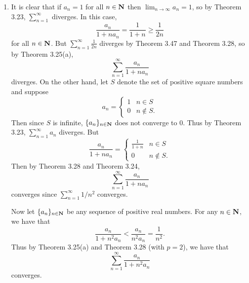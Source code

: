 \begin{ex}
\begin{enumerate}
\item It is clear that if $a_n = 1$ for all $n \in \mathbf{N}$ then $\lim_{n\to\infty}a_n = 1$, so by Theorem 3.23, $\sum_{n = 1}^{\infty}$ diverges. In this case, \[\frac{a_n}{1 + na_n} = \frac{1}{1 + n} \geq \frac{1}{2n}\] for all $n \in \mathbf{N}$. But $\sum_{n = 1}^{\infty}\frac{1}{2n}$ diverges by Theorem 3.47 and Theorem 3.28, so by Theorem 3.25(a), \[\sum_{n = 1}^{\infty}\frac{a_n}{1 + na_n}\] diverges. On the other hand, let $S$ denote the set of positive square numbers and suppose \[a_n = \begin{cases}
1 & n\in S\\
0 & n\not\in S.
\end{cases}\] Then since $S$ is infinite, $\{a_n\}_{n \in \mathbf{N}}$ does not converge to 0. Thus by Theorem 3.23, $\sum_{n = 1}^{\infty}a_n$ diverges. But \[\frac{a_n}{1 + na_n} = \begin{cases}
\frac{1}{1 + n} & n \in S\\
0 & n\not\in S.
\end{cases}\] Then by Theorem 3.28 and Theorem 3.24, \[\sum_{n = 1}^{\infty}\frac{a_n}{1 + na_n}\] converges since $\sum_{n = 1}^{\infty}1/n^2$ converges.

Now let $\{a_n\}_{n \in \mathbf{N}}$ be any sequence of positive real numbers. For any $n \in \mathbf{N}$, we have that \[\frac{a_n}{1 + n^2a_n} < \frac{a_n}{n^2a_n} = \frac{1}{n^2}.\] Thus by Theorem 3.25(a) and Theorem 3.28 (with $p = 2$), we have that \[\sum_{n = 1}^{\infty}\frac{a_n}{1 + n^2a_n}\] converges.
\end{enumerate}
\end{ex}


